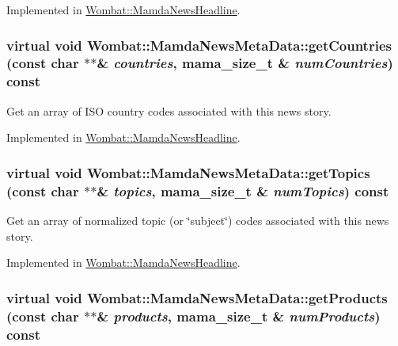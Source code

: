 Implemented in \hyperlink{classWombat_1_1MamdaNewsHeadline_7f6db5ebceef1b50448604c270d31c4f}{Wombat::Mamda\-News\-Headline}.\hypertarget{classWombat_1_1MamdaNewsMetaData_c91f16ff5d1b843a872254a5e8493cc3}{
\subsubsection[getCountries]{\setlength{\rightskip}{0pt plus 5cm}virtual void Wombat::Mamda\-News\-Meta\-Data::get\-Countries (const char $\ast$$\ast$\& {\em countries}, mama\_\-size\_\-t \& {\em num\-Countries}) const}}
\label{classWombat_1_1MamdaNewsMetaData_c91f16ff5d1b843a872254a5e8493cc3}


Get an array of ISO country codes associated with this news story. 



Implemented in \hyperlink{classWombat_1_1MamdaNewsHeadline_9f753e8e23984a3f229cd860f031cb7a}{Wombat::Mamda\-News\-Headline}.\hypertarget{classWombat_1_1MamdaNewsMetaData_2f4ff23afa293710b658b94ecb0ab63d}{
\subsubsection[getTopics]{\setlength{\rightskip}{0pt plus 5cm}virtual void Wombat::Mamda\-News\-Meta\-Data::get\-Topics (const char $\ast$$\ast$\& {\em topics}, mama\_\-size\_\-t \& {\em num\-Topics}) const}}
\label{classWombat_1_1MamdaNewsMetaData_2f4ff23afa293710b658b94ecb0ab63d}


Get an array of normalized topic (or \char`\"{}subject\char`\"{}) codes associated with this news story. 



Implemented in \hyperlink{classWombat_1_1MamdaNewsHeadline_32409e948ff75b589569022baa988cbf}{Wombat::Mamda\-News\-Headline}.\hypertarget{classWombat_1_1MamdaNewsMetaData_1b7d9ba9d0e807d16ada32145c937e73}{
\subsubsection[getProducts]{\setlength{\rightskip}{0pt plus 5cm}virtual void Wombat::Mamda\-News\-Meta\-Data::get\-Products (const char $\ast$$\ast$\& {\em products}, mama\_\-size\_\-t \& {\em num\-Products}) const}}
\label{classWombat_1_1MamdaNewsMetaData_1b7d9ba9d0e807d16ada32145c937e73}



